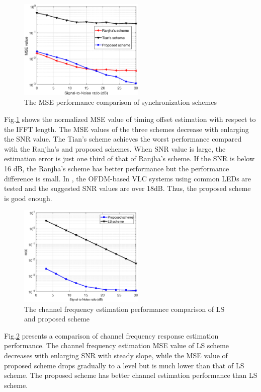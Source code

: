 \documentclass[10pt,journal]{IEEEtran}
\begin{document}
	\begin{figure}[!htb]
        \captionsetup{belowskip=-10pt}
    	\centering \includegraphics[width=6cm]{synchronization_mse.eps}
		\caption{The MSE performance comparison of synchronization schemes} \label{fig:synchronization_mse}
    \end{figure}
    Fig.\ref{fig:synchronization_mse} shows the normalized MSE value of timing offset estimation with respect to the IFFT length. The MSE values of the three schemes decrease with enlarging the SNR value. The Tian's scheme achieves the worst performance compared with the Ranjha's and proposed schemes. When SNR value is large, the estimation error is just one third of that of Ranjha's scheme. If the SNR is below 16 dB, the Ranjha's scheme has better performance but the performance difference is small.
    In \cite{chow2013adaptive}, the OFDM-based VLC systems using common LEDs are tested and the suggested SNR values are over 18dB.
    Thus, the proposed scheme is good enough.

    \begin{figure}[!htb]
        \setlength{\abovecaptionskip}{10pt}
        \captionsetup{belowskip=-10pt}
    	\centering \includegraphics[width=6cm]{channel_estimation_HMSE.eps}
		\caption{The channel frequency estimation performance comparison of LS and proposed scheme}
        \label{fig:channel_estimation_HMSE}
    \end{figure}
    Fig.\ref{fig:channel_estimation_HMSE} presents a comparison of channel frequency response estimation performance. The channel frequency estimation MSE value of LS scheme decreases with enlarging SNR with steady slope, while the MSE value of proposed scheme drops gradually to a level but is much lower than that of LS scheme. The proposed scheme has better channel estimation performance than LS scheme.
\end{document}
